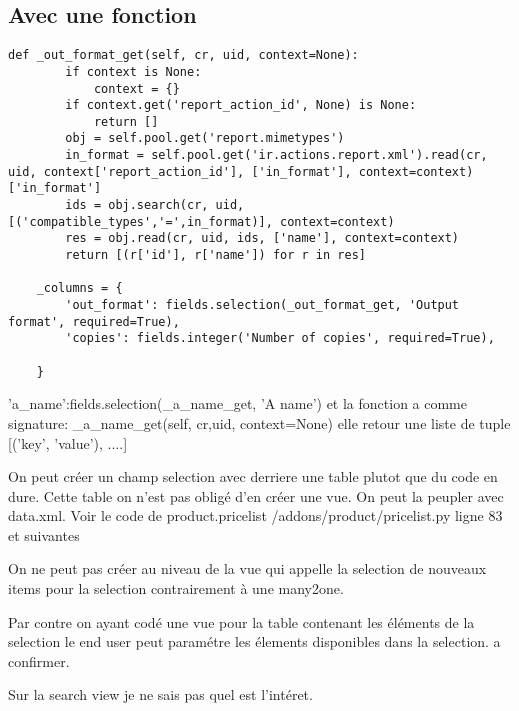 \documentclass[12pt,a4paper]{article}
\begin{document}
\subsection{Avec une fonction}
\label{sec:fonction}
\begin{verbatim}
def _out_format_get(self, cr, uid, context=None):
        if context is None:
            context = {}
        if context.get('report_action_id', None) is None:
            return []
        obj = self.pool.get('report.mimetypes')
        in_format = self.pool.get('ir.actions.report.xml').read(cr, uid, context['report_action_id'], ['in_format'], context=context)['in_format']
        ids = obj.search(cr, uid, [('compatible_types','=',in_format)], context=context)
        res = obj.read(cr, uid, ids, ['name'], context=context)
        return [(r['id'], r['name']) for r in res]

    _columns = {
        'out_format': fields.selection(_out_format_get, 'Output format', required=True),
        'copies': fields.integer('Number of copies', required=True),

    }
\end{verbatim}
'a\_name':fields.selection(\_a\_name\_get, 'A name')
et la fonction a comme signature: \_a\_name\_get(self, cr,uid, context=None)
elle retour une liste de tuple [('key', 'value'), ....]

On peut créer un champ selection avec derriere une table plutot que du code en dure.
Cette table on n'est pas obligé d'en créer une vue. On peut la peupler avec data.xml.
Voir le code de product.pricelist /addons/product/pricelist.py ligne 83 et suivantes

On ne peut pas créer au niveau de la vue qui appelle la selection de nouveaux items pour la selection contrairement à une many2one. 

Par contre on ayant codé une vue pour la table contenant les éléments de la selection le end user peut paramétre les élements disponibles dans la selection. a confirmer.



Sur la search view je ne sais pas quel est l'intéret.
\end{document}
